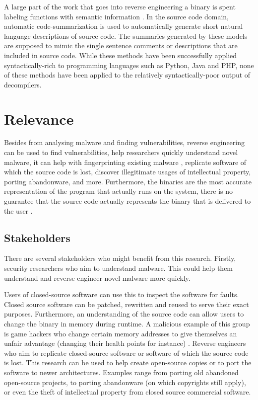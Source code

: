 A large part of the work that goes into reverse engineering a binary is spent labeling functions with semantic information \cite{reverseEngineerProcess}. In the source code domain, automatic code-summarization is \cite{recommend_summarization} used to automatically generate short natural language descriptions of source code. The summaries generated by these models are supposed to mimic the single sentence comments or descriptions that are included in source code. While these methods have been successfully applied syntactically-rich to programming languages such as Python, Java and PHP\cite{CodeT5, CodeBERT, CodeX}, none of these methods have been applied to the relatively syntactically-poor output of decompilers.

\section{Relevance}
Besides from analysing malware and finding vulnerabilities, reverse engineering can be used to find vulnerabilities, help researchers quickly understand novel malware, it can help with fingerprinting existing malware \cite{TypeInferenceSurvey}, replicate software of which the source code is lost, discover illegitimate usages of intellectual property, porting abandonware, and more\cite{TypeInferenceSurvey}. Furthermore, the binaries are the most accurate representation of the program that actually runs on the system, there is no guarantee that the source code actually represents the binary that is delivered to the user \cite{TypeInferenceSurvey}. 
\subsection{Stakeholders}
There are several stakeholders who might benefit from this research. Firstly, security researchers who aim to understand malware. This could help them understand and reverse engineer novel malware more quickly. 

Users of closed-source software can use this to inspect the software for faults. Closed source software can be patched, rewritten and reused to serve their exact purposes. Furthermore, an understanding of the source code can allow users to change the binary in memory during runtime. A malicious example of this group is game hackers who change certain memory addresses to give themselves an unfair advantage (changing their health points for instance) \cite{TypeInferenceSurvey}. 
Reverse engineers who aim to replicate closed-source software or software of which the source code is lost. This research can be used to help create open-source copies or to port the software to newer architectures. Examples range from porting old abandoned open-source projects, to porting abandonware (on which copyrights still apply), or even the theft of intellectual property from closed source commercial software.


